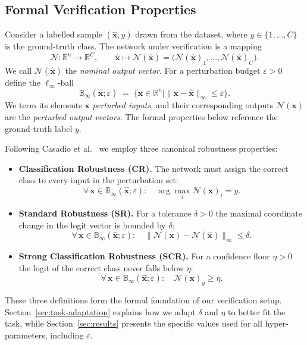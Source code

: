 \subsection{Formal Verification Properties}
\label{sec:formal-properties}

Consider a labelled sample \((\boldsymbol{\hat{x}},y)\) drawn from the dataset, where
\(y\in\{1,\ldots,C\}\) is the ground-truth class.  
The network under verification is a mapping
\[
  \mathcal{N} : \mathbb{R}^{n} \longrightarrow \mathbb{R}^{C},\qquad
  \boldsymbol{\hat{x}}\mapsto
  \mathcal{N}(\boldsymbol{\hat{x}})
  =\bigl(\mathcal{N}(\boldsymbol{\hat{x}})_{1},\dots,\mathcal{N}(\boldsymbol{\hat{x}})_{C}\bigr).
\]
We call \(\mathcal{N}(\boldsymbol{\hat{x}})\) the \emph{nominal output vector}.
For a perturbation budget \(\varepsilon>0\) define the $\ell_{\infty}$-ball
\[
  \mathbb{B}_{\infty}(\boldsymbol{\hat{x}};\varepsilon)
  \;=\;
  \bigl\{\boldsymbol{x}\in\mathbb{R}^{n}\mid
        \|\boldsymbol{x}-\boldsymbol{\hat{x}}\|_{\infty}\le\varepsilon\bigr\}.
\]
We term its elements \(\boldsymbol{x}\) \emph{perturbed inputs}, and their corresponding outputs \(\mathcal{N}(\boldsymbol{x})\) are the \emph{perturbed output vectors}.
The formal properties below reference the ground-truth label \(y\).

Following Casadio et al.~\cite{casadio2022neural} we employ three canonical
robustness properties:

\begin{itemize}
\item \textbf{Classification Robustness (CR).}
      The network must assign the correct class to every input in the
      perturbation set:
      \[
        \forall\,\boldsymbol{x}\in\mathbb{B}_{\infty}(\boldsymbol{\hat{x}};\varepsilon):\quad
        \arg\max_{i}\mathcal{N}(\boldsymbol{x})_{i}=y.
      \]
\item \textbf{Standard Robustness (SR).}
      For a tolerance \(\delta>0\) the maximal coordinate change in the logit
      vector is bounded by \(\delta\):
      \[
        \forall\,\boldsymbol{x}\in\mathbb{B}_{\infty}(\boldsymbol{\hat{x}};\varepsilon):\quad
        \|\mathcal{N}(\boldsymbol{x})-\mathcal{N}(\boldsymbol{\hat{x}})\|_{\infty}\le\delta.
      \]
\item \textbf{Strong Classification Robustness (SCR).}
      For a confidence floor \(\eta>0\) the logit of the correct class never
      falls below \(\eta\):
      \[
        \forall\,\boldsymbol{x}\in\mathbb{B}_{\infty}(\boldsymbol{\hat{x}};\varepsilon):\quad
        \mathcal{N}(\boldsymbol{x})_{y}\ge\eta.
      \]
\end{itemize}


These three definitions form the formal foundation of our verification setup. Section~\ref{sec:task-adaptation} explains how we adapt \(\delta\) and \(\eta\) to better fit the task, while Section~\ref{sec:results} presents the specific values used for all hyper-parameters, including \(\varepsilon\).